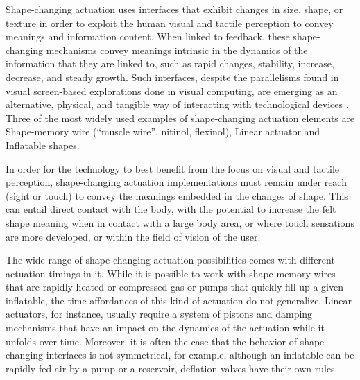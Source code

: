 Shape-changing actuation uses interfaces that exhibit changes in size, shape, or texture in order to exploit the human visual and tactile perception to convey meanings and information content. When linked to feedback, these shape-changing mechanisms convey meanings intrinsic in the dynamics of the information that they are linked to, such as rapid changes, stability, increase, decrease, and steady growth. Such interfaces, despite the parallelisms found in visual screen-based explorations done in visual computing, are emerging as an alternative, physical, and tangible way of interacting with technological devices \cite{alexander_shape-changing_2017}.
Three of the most widely used examples of shape-changing actuation elements are Shape-memory wire (``muscle wire'', nitinol, flexinol), Linear actuator and Inflatable shapes.

In order for the technology to best benefit from the focus on visual and tactile perception, shape-changing actuation implementations must remain under reach (sight or touch) to convey the meanings embedded in the changes of shape. This can entail direct contact with the body, with the potential to increase the felt shape meaning when in contact with a large body area, or where touch sensations are more developed, or within the field of vision of the user.

The wide range of shape-changing actuation possibilities comes with different actuation timings in it. While it is possible to work with shape-memory wires that are rapidly heated or compressed gas or pumps that quickly fill up a given inflatable, the time affordances of this kind of actuation do not generalize. Linear actuators, for instance, usually require a system of pistons and damping mechanisms that have an impact on the dynamics of the actuation while it unfolds over time. Moreover, it is often the case that the behavior of shape-changing interfaces is not symmetrical, for example, although an inflatable can be rapidly fed air by a pump or a reservoir, deflation valves have their own rules.

